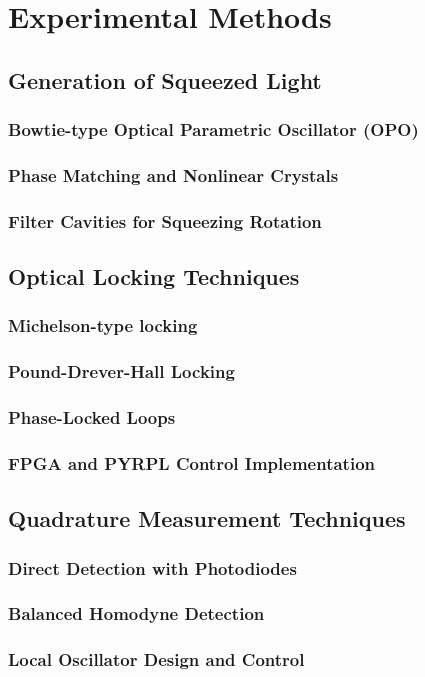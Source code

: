 
\chapter{Experimental Methods} \label{chap:cooling}
\section{Generation of Squeezed Light}
\subsection{Bowtie-type Optical Parametric Oscillator (OPO)}

\subsection{Phase Matching and Nonlinear Crystals}

\subsection{Filter Cavities for Squeezing Rotation}
\hspace{1pt}
\section{Optical Locking Techniques}
\subsection{\color{red} Michelson-type locking}
\subsection{Pound-Drever-Hall Locking}
\subsection{Phase-Locked Loops}
\subsection{FPGA and PYRPL Control Implementation}
\hspace{1pt}
\section{Quadrature Measurement Techniques}
\subsection{Direct Detection with Photodiodes}
\subsection{Balanced Homodyne Detection}
\subsection{Local Oscillator Design and Control}
